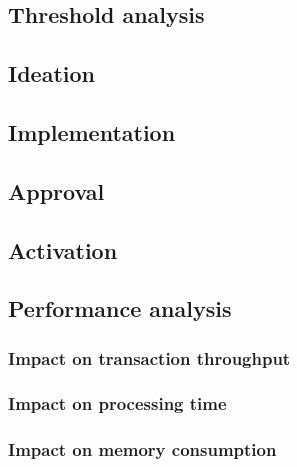 \documentclass[11pt,a4paper]{article}
\begin{document}
\subsection{Threshold analysis}
\label{sec:threshold-analysis}

\subsection{Ideation}
\label{sec:ideation}

\subsection{Implementation}
\label{sec:implementation}

\subsection{Approval}
\label{sec:approval}

\subsection{Activation}
\label{sec:activation}


\subsection{Performance analysis}
\label{sec:performance-analysis}

\subsubsection{Impact on transaction throughput}
\label{sec:impact-trans-thro}

\subsubsection{Impact on processing time}
\label{sec:impact-proc-time}

\subsubsection{Impact on memory consumption}
\label{sec:impact-memory-cons}
\end{document}
